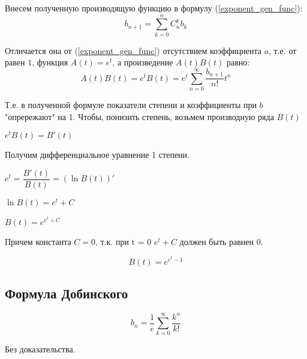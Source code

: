 Внесем полученную производящую функцию в формулу (\ref{exponent_gen_func}):
$$
b_{n+1} =  \sum\limits_{k = 0}^{n} C_{n}^{k} b_{k} 
$$

Отличается она от (\ref{exponent_gen_func}) 
отсутствием коэффициента $ a $, т.е. от равен $ 1 $,
функция $ A(t) = e^{t} $, а произведение $ A(t)B(t) $ равно:
$$
A(t)B(t) = e^{t} B(t) = e^{t} \sum\limits_{n=0}^{\infty} \dfrac{b_{n+1}}{n!} t^{n}
$$

Т.е. в полученной формуле показатели степени и коэффициенты при $ b $ "опрережают" 
на 1.
Чтобы, понизить степень, возьмем производную ряда $ B(t) $

$e^{t} B(t) = B'(t)$

Получим дифференциальное уравнение 1 степени.

$e^{t} = \dfrac{B'(t)}{B(t)} = (\ln{ B(t) })' $

$\ln B(t) = e^{t} + C $

$ B(t) = e^{e^{t} + C} $

Причем константа $ C = 0 $, т.к. при t = 0 $e^{t} + C $ должен быть равнен $ 0 $.

$$
B(t) = e^{e^{t} - 1}
$$


\subsection{Формула Добинского}

$$
b_n = \dfrac{1}{e}\sum_{k=0}^\infty \dfrac{k^n}{k!}
$$

Без доказательства.